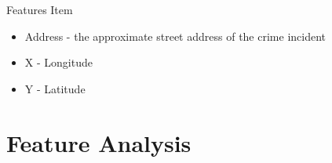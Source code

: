 \documentclass[
 size=14pt,
 paper=smartboard,  %
 mode=present, 		%
 display=slides, 	%
 style=tuliplab,  	%
 pauseslide,
 fleqn,leqno]{powerdot}
\begin{document}
\begin{slide}{Features Item}
  \begin{itemize}
    \item Address - the approximate street address of the crime incident
    \item X - Longitude
    \item Y - Latitude
  \end{itemize}
\end{slide}


\section{Feature Analysis}


\end{document}
